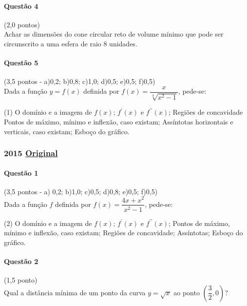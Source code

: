 \documentclass[12pt,a4paper]{article}
\newcommand{\original}[1]{\tiny \href{#1}{Original} \normalsize}
\begin{document}
\paragraph{Questão 4} (2,0 pontos)\\
Achar as dimensões do cone circular reto de volume mínimo que pode ser circunscrito a uma esfera de raio 8 unidades.

\paragraph{Questão 5} (3,5 pontos - a)0,2; b)0,8; c)1,0; d)0,5; e)0,5; f)0,5)\\
Dada a função $y=f(x)$ definida por $f(x) = \dfrac{x}{\sqrt[3]{x^2-1}}$, pede-se:
\begin{tasks}(1)
\task O domínio e a imagem de $f(x)$;
\task $f^{\prime}(x)$ e $f^{\prime\prime}(x)$;
\task Regiões de concavidade
\task Pontos de máximo, mínimo e inflexão, caso existam;
\task Assíntotas horizontais e verticais, caso existam;
\task Esboço do gráfico.
\end{tasks}

\newpage

\subsubsection{2015 \original{https://drive.google.com/open?id=1mdAzrMdfrA7_gXcNztzUJuo4iLVIb7V_}}

\paragraph{Questão 1} (3,5 pontos - a) 0,2; b)1,0; c)0,5; d)0,8; e)0,5; f)0,5)\\
Dada a função $f$ definida por $f(x) = \dfrac{4x+x^2}{x^2-1}$, pede-se:

\begin{tasks}(2)
\task O domínio e a imagem de $f(x)$;
\task $f^{\prime}(x)$ e $f^{\prime\prime}(x)$;
\task Pontos de máximo, mínimo e inflexão, caso existam;
\task Regiões de concavidade;
\task Assíntotas;
\task Esboço do gráfico.
\end{tasks}

\paragraph{Questão 2} (1,5 ponto)\\
Qual a distância mínima de um ponto da curva $y=\sqrt{x}$ ao ponto $\left(\dfrac{3}{2}, 0 \right)$?
\end{document}
